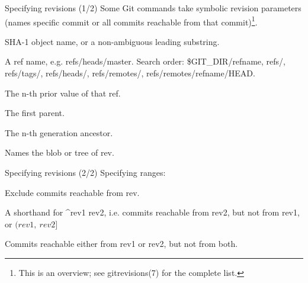 \begin{frame}{Specifying revisions (1/2)}
  Some Git commands take symbolic revision parameters (names specific commit or all commits reachable from that commit)\footnote{This is an overview; see gitrevisions(7) for the complete list.}.

  \begin{description}[]
  \item[\LT sha1\GT] SHA-1 object name, or a non-ambiguous leading substring.
  \item[\LT refname\GT] A ref name, e.g. refs/heads/master. Search order: {\ttfamily\scriptsize \$GIT\_DIR/\LT refname\GT, refs/, refs/tags/, refs/heads/, refs/remotes/, refs/remotes/\LT refname\GT/HEAD}.
  \item[\LT refname\GT@\{\LT n\GT\}] The n-th prior value of that ref.
  \item[\LT rev\GT\^{}] The first parent.
  \item[\LT rev\GT\~{}\LT n\GT] The n-th generation ancestor.
  \item[\LT rev\GT:\LT path\GT] Names the blob or tree of \LT rev\GT.
  \end{description}
\end{frame}

\begin{frame}{Specifying revisions (2/2)}
  Specifying ranges:

  \begin{description}[]
  \item[\^{}\LT rev\GT] Exclude commits reachable from \LT rev\GT.
  \item[\LT rev1\GT..\LT rev2\GT] A shorthand for \^{}rev1 rev2, i.e. commits reachable from rev2, but not from rev1, or $\big(rev1,\ rev2\big]$
  \item[\LT rev1\GT...\LT rev2\GT] Commits reachable either from rev1 or rev2, but not from both.
  \end{description}
\end{frame}
